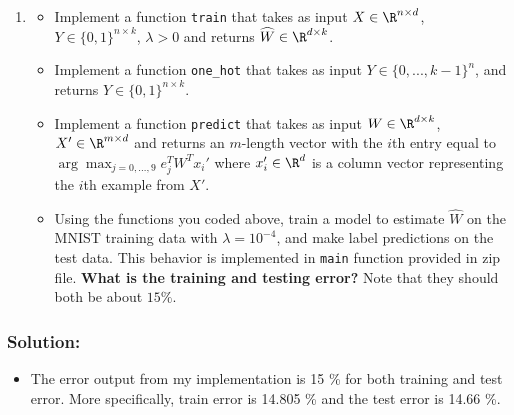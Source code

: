 \documentclass[shortlabels]{article}
\begin{document}
\begin{aprob}
\begin{enumerate}
        \newpage
        \item {}
        \begin{itemize}
            \item Implement a function \verb|train| that takes as input $X \in\R^{n \times d}$, $Y \in \{0,1\}^{n \times k}$, $\lambda > 0$ and returns $\widehat{W} \in \R^{d \times k}$.
            \item Implement a function \verb|one_hot| that takes as input $Y \in \{0, ..., k-1\}^{n}$, and returns $Y \in \{0,1\}^{n \times k}$.
            \item Implement a function  \verb|predict| that takes as input $W \in \R^{d \times k}$, $X' \in\R^{m \times d}$ and returns an $m$-length vector with the $i$th entry equal to $\arg\max_{j=0,\dots,9} e_j^T W^T x_i'$ where $x_i' \in \R^d$ is a column vector representing the $i$th example from $X'$.
            \item Using the functions you coded above, train a model to estimate $\widehat{W}$ on the MNIST training data with $\lambda = 10^{-4}$, and make label predictions on the test data. This behavior is implemented in \verb|main| function provided in zip file. {\bf What is the training and testing error?} Note that they should both be about $15\%$. 
        \end{itemize}
    \end{enumerate}

    \subsubsection*{Solution:}
    \begin{itemize}
        \item The error output from my implementation is 15 \% for both training and test error. More specifically, train error is 14.805 \% and the test error is 14.66 \%. 
    \end{itemize}
\end{aprob}
\end{document}
